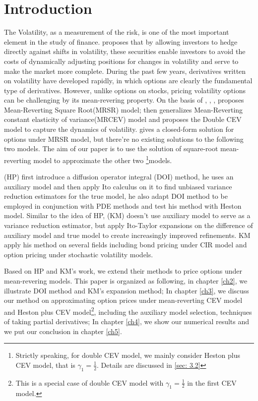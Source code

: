 \chapter{Introduction}

The Volatility, as a measurement of the risk, is one of the most important element in the study of finance. \cite{whaley_derivatives_1993} proposes that by allowing investors to hedge directly against shifts in volatility, these securities enable investors to avoid the costs of dynamically adjusting positions for changes in volatility and serve to make the market more complete. During the past few years, derivatives written on volatility have developed rapidly, in which options are clearly the fundamental type of derivatives. However, unlike options on stocks, pricing volatility options can be challenging by its mean-revering property. On the basis of \cite{cox_theory_1985}, \cite{hull_pricing_1987}, \cite{heston_closed-form_1993}, \cite{grunbichler_valuing_1996} proposes Mean-Reverting Square Root(MRSR) model; \cite{chan_empirical_1992} then generalizes Mean-Reverting constant elasticity of variance(MRCEV) model and \cite{gatheral_consistent_2008} proposes the Double CEV model to capture the dynamics of volatility. \cite{grunbichler_valuing_1996} gives a closed-form solution for options under MRSR model, but there're no existing solutions to the following two models. The aim of our paper is to use the solution of square-root mean-reverting model to approximate the other two \footnote{Strictly speaking, for double CEV model, we mainly consider Heston plus CEV model, that is $\gamma_1=\frac{1}{2}$. Details are discussed in \ref{sec: 3.2}}{models}.

\cite{heath_variance_2002}(HP) first introduce a diffusion operator integral (DOI) method, he uses an auxiliary model and then apply Ito calculus on it to find unbiased variance reduction estimators for the true model, he also adapt DOI method to be employed in conjunction with PDE methods and test his method with Heston model. Similar to the idea of HP, \cite{kristensen_adding_2011}(KM) doesn't use auxiliary model to serve as a variance reduction estimator, but apply Ito-Taylor expansions on the difference of auxiliary model and true model to  create increasingly improved refinements. KM apply his method on several fields including bond pricing under CIR model and option pricing under stochastic volatility models.

Based on HP and KM's work, we extend their methods to price options under mean-revering models. This paper is organized as following, in chapter \ref{ch2}, we illustrate DOI method and KM's expansion method; In chapter \ref{ch3}, we discuss our method on approximating option prices under mean-reverting CEV model and {Heston plus CEV model}\footnote{This is a special case of double CEV model with $\gamma_1=\frac{1}{2}$ in the first CEV model.}, including the auxiliary model selection, techniques of taking partial derivatives; In chapter \ref{ch4}, we show our numerical results and we put our conclusion in chapter \ref{ch5}.
